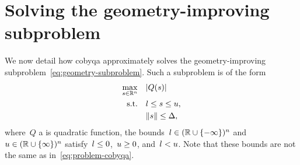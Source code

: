 

\section{Solving the geometry-improving subproblem}
\label{sec:cobyqa-geometry-improving}

We now detail how \gls{cobyqa} approximately solves the geometry-improving subproblem~\cref{eq:geometry-subproblem}.
Such a subproblem is of the form
\begin{subequations}
    \label{eq:geometry-simple}
    \begin{align}
        \max_{\sstep \in \R^n}  & \quad \abs{Q(\sstep)}\\
        \text{s.t.}             & \quad \xl \le \sstep \le \xu,\\
                                & \quad \norm{\sstep} \le \rad,
    \end{align}
\end{subequations}
where~$Q$ a is quadratic function, the bounds~$l \in (\mathbb{R} \cup \{-\infty\})^n$ and~$u \in (\mathbb{R} \cup \{\infty\})^n$ satisfy~$l \le 0$,~$u \ge 0$, and~$l < u$.
Note that these bounds are not the same as in~\cref{eq:problem-cobyqa}.

